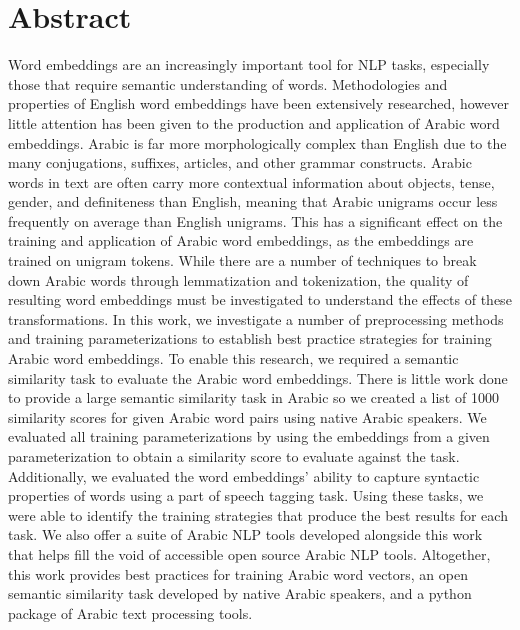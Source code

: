 \section*{Abstract}

Word embeddings are an increasingly important tool for NLP tasks, especially those that require semantic understanding of words.
Methodologies and properties of English word embeddings have been extensively researched, however little attention has been given to the production and application of Arabic word embeddings.
Arabic is far more morphologically complex than English due to the many conjugations, suffixes, articles, and other grammar constructs.
Arabic words in text are often carry more contextual information about objects, tense, gender, and definiteness than English, meaning that Arabic unigrams occur less frequently on average than English unigrams.
This has a significant effect on the training and application of Arabic word embeddings, as the embeddings are trained on unigram tokens.
While there are a number of techniques to break down Arabic words through lemmatization and tokenization, the quality of resulting word embeddings must be investigated to understand the effects of these transformations.
In this work, we investigate a number of preprocessing methods and training parameterizations to establish best practice strategies for training Arabic word embeddings.
To enable this research, we required a semantic similarity task to evaluate the Arabic word embeddings.
There is little work done to provide a large semantic similarity task in Arabic so we created a list of 1000 similarity scores for given Arabic word pairs using native Arabic speakers.
We evaluated all training parameterizations by using the embeddings from a given parameterization to obtain a similarity score to evaluate against the task.
Additionally, we evaluated the word embeddings' ability to capture syntactic properties of words using a part of speech tagging task.
Using these tasks, we were able to identify the training strategies that produce the best results for each task.
We also offer a suite of Arabic NLP tools developed alongside this work that helps fill the void of accessible open source Arabic NLP tools.
Altogether, this work provides best practices for training Arabic word vectors, an open semantic similarity task developed by native Arabic speakers, and a python package of Arabic text processing tools.